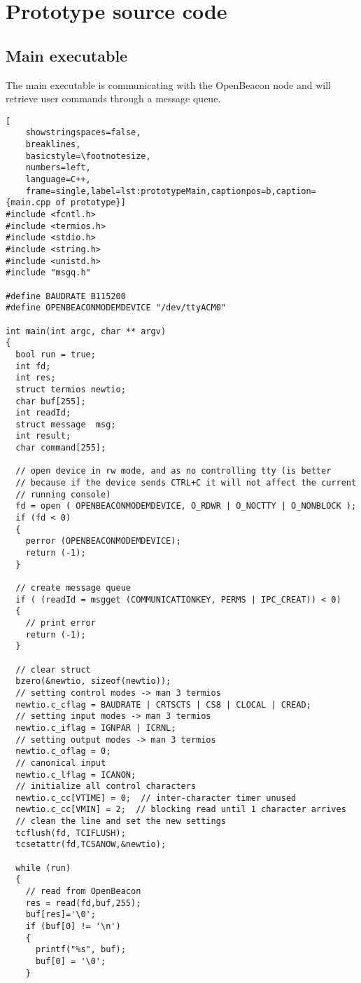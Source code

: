 \chapter{Prototype source code}
\label{app:prototypeCode}

 \section{Main executable}
  The main executable is communicating with the OpenBeacon node and will retrieve user commands through a message queue.
  \singlespacing
  \begin{lstlisting}[
  	showstringspaces=false,
  	breaklines,
  	basicstyle=\footnotesize,
  	numbers=left,
  	language=C++,
  	frame=single,label=lst:prototypeMain,captionpos=b,caption={main.cpp of prototype}]
#include <fcntl.h>
#include <termios.h>
#include <stdio.h>
#include <string.h>
#include <unistd.h>
#include "msgq.h"

#define BAUDRATE B115200
#define OPENBEACONMODEMDEVICE "/dev/ttyACM0"

int main(int argc, char ** argv)
{
  bool run = true;
  int fd;
  int res;
  struct termios newtio;
  char buf[255];
  int readId;
  struct message  msg;
  int result;
  char command[255];

  // open device in rw mode, and as no controlling tty (is better
  // because if the device sends CTRL+C it will not affect the current
  // running console)
  fd = open ( OPENBEACONMODEMDEVICE, O_RDWR | O_NOCTTY | O_NONBLOCK );
  if (fd < 0)
  {
    perror (OPENBEACONMODEMDEVICE);
    return (-1);
  }

  // create message queue
  if ( (readId = msgget (COMMUNICATIONKEY, PERMS | IPC_CREAT)) < 0)
  {
    // print error
    return (-1);
  }

  // clear struct
  bzero(&newtio, sizeof(newtio));
  // setting control modes -> man 3 termios
  newtio.c_cflag = BAUDRATE | CRTSCTS | CS8 | CLOCAL | CREAD;
  // setting input modes -> man 3 termios
  newtio.c_iflag = IGNPAR | ICRNL;
  // setting output modes -> man 3 termios
  newtio.c_oflag = 0;
  // canonical input
  newtio.c_lflag = ICANON;
  // initialize all control characters
  newtio.c_cc[VTIME] = 0;  // inter-character timer unused
  newtio.c_cc[VMIN] = 2;  // blocking read until 1 character arrives
  // clean the line and set the new settings
  tcflush(fd, TCIFLUSH);
  tcsetattr(fd,TCSANOW,&newtio);

  while (run)
  {
    // read from OpenBeacon
    res = read(fd,buf,255);
    buf[res]='\0';
    if (buf[0] != '\n')
    {
      printf("%s", buf);
      buf[0] = '\0';
    }


\end{lstlisting}
